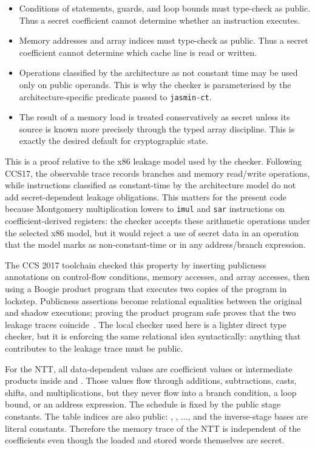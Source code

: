 \begin{itemize}
  \item Conditions of  statements,  guards, and loop
        bounds must type-check as public.  Thus a secret coefficient cannot
        determine whether an instruction executes.
  \item Memory addresses and array indices must type-check as public.  Thus a
        secret coefficient cannot determine which cache line is read or
        written.
  \item Operations classified by the architecture as not constant time may be
        used only on public operands.  This is why the checker is parameterised
        by the architecture-specific predicate passed to
        \texttt{jasmin-ct}.
  \item The result of a memory load is treated conservatively as secret unless
        its source is known more precisely through the typed array discipline.
        This is exactly the desired default for cryptographic state.
\end{itemize}

This is a proof relative to the \jasmin{} x86 leakage model used by the
checker.  Following CCS17, the observable trace records branches and memory
read/write operations, while instructions classified as constant-time by the
architecture model do not add secret-dependent leakage obligations.  This
matters for the present code because Montgomery multiplication lowers to
\texttt{imul} and \texttt{sar} instructions on coefficient-derived registers:
the checker accepts these arithmetic operations under the selected x86 model,
but it would reject a use of secret data in an operation that the model marks
as non-constant-time or in any address/branch expression.

The CCS 2017 toolchain checked this property by inserting publicness
annotations on control-flow conditions, memory accesses, and array accesses,
then using a Boogie product program that executes two copies of the program in
lockstep.  Publicness assertions become relational equalities between the
original and shadow executions; proving the product program safe proves that
the two leakage traces coincide~\cite{Almeida2017}.  The local
 checker used here is a lighter direct type checker, but it is
enforcing the same relational idea syntactically: anything that contributes to
the leakage trace must be public.

For the \haetae{} NTT, all data-dependent values are coefficient values or
intermediate products inside  and
.  Those values flow through additions,
subtractions, casts, shifts, and multiplications, but they never flow into a
branch condition, a loop bound, or an address expression.  The schedule is
fixed by the public stage constants.  The table indices are also public:
, , \(\ldots\), and the inverse-stage bases are
literal constants.  Therefore the memory trace of the NTT is independent of
the coefficients even though the loaded and stored words themselves are
secret.

